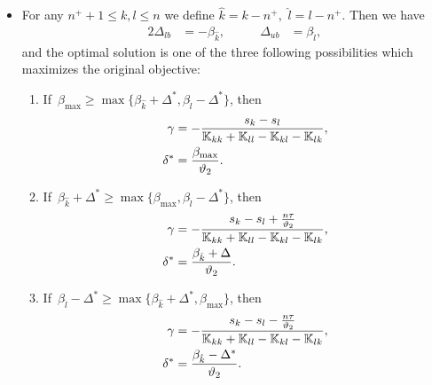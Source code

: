 \begin{theorem}
\begin{itemize}
    \item For any $n^+ + 1\le k,l \le n$ we define $\hat{k} = k - n^+,$ $\hat{l} = l - n^+.$ Then we have
    \begin{alignat*}{2}
      \Delta_{lb} & = - \beta_{\hat{k}}, & \qquad
      \Delta_{ub} & = \beta_{\hat{l}},
    \end{alignat*}
    and the optimal solution is one of the three following possibilities which maximizes the original objective:
    \begin{enumerate}
      \item If~$\beta_{\max} \geq \max\{\beta_{\hat{k}} + \Delta^{*}, \beta_{\hat{l}} - \Delta^{*}\}$, then
      \begin{align*}
        \gamma     & = -\frac{s_k - s_l}{\mathbb{K}_{kk} + \mathbb{K}_{ll} - \mathbb{K}_{kl} - \mathbb{K}_{lk}}, \\
        \delta^{*} & = \frac{\beta_{\max}}{\vartheta_2}.
      \end{align*}
      \item If~$\beta_{\hat{k}} + \Delta^{*} \geq \max\{\beta_{\max} , \beta_{\hat{l}} - \Delta^{*}\}$, then
      \begin{align*}
        \gamma     & = -\frac{s_k - s_l + \frac{n\tau}{\vartheta_2}}{\mathbb{K}_{kk} + \mathbb{K}_{ll} - \mathbb{K}_{kl} - \mathbb{K}_{lk}}, \\
        \delta^{*} & = \frac{\beta_{\hat{k}} + \Delta}{\vartheta_2}.
      \end{align*}
      \item If~$\beta_{\hat{l}} - \Delta^{*} \geq \max\{\beta_{\hat{k}} + \Delta^{*}, \beta_{\max}\}$, then
      \begin{align*}
        \gamma     & = -\frac{s_k - s_l - \frac{n\tau}{\vartheta_2}}{\mathbb{K}_{kk} + \mathbb{K}_{ll} - \mathbb{K}_{kl} - \mathbb{K}_{lk}}, \\
        \delta^{*} & = \frac{\beta_{\hat{k}} - \Delta^{*}}{\vartheta_2}.
      \end{align*}
    \end{enumerate}
  \end{itemize}
\end{theorem}